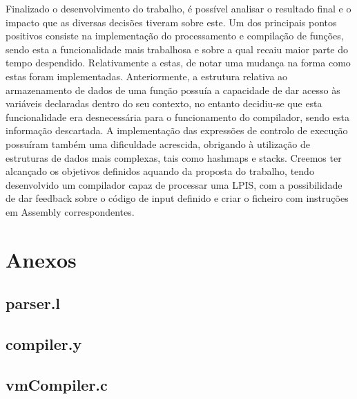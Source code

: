 \documentclass[a4paper,10pt]{report}
\begin{document}
Finalizado o desenvolvimento do trabalho, é possível analisar o resultado final e o impacto que as diversas decisões tiveram sobre este. Um dos principais pontos positivos consiste na implementação do processamento e compilação de funções, sendo esta a funcionalidade mais trabalhosa e sobre a qual recaiu maior parte do tempo despendido. Relativamente a estas, de notar uma mudança na forma como estas foram implementadas. Anteriormente, a estrutura relativa ao armazenamento de dados de uma função possuía a capacidade de dar acesso às variáveis declaradas dentro do seu contexto, no entanto decidiu-se que esta funcionalidade era desnecessária para o funcionamento do compilador, sendo esta informação descartada. A implementação das expressões de controlo de execução possuíram também uma dificuldade acrescida, obrigando à utilização de estruturas de dados mais complexas, tais como hashmaps e stacks. Creemos ter alcançado os objetivos definidos aquando da proposta do trabalho, tendo desenvolvido um compilador capaz de processar uma LPIS, com a possibilidade de dar feedback sobre o código de input definido e criar o ficheiro com instruções em Assembly correspondentes.


\chapter{Anexos}
\section{parser.l}

\section{compiler.y}

\section{vmCompiler.c}

\end{document}
